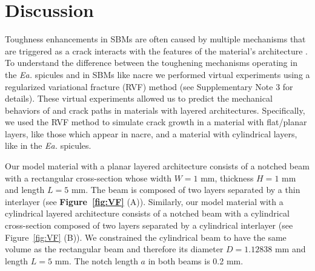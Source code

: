 \documentclass[12pt,onecolumn]{article}
\makeatletter
\DeclareRobustCommand*{\nameref}[1]{%
      \emph{\myorg@nameref{#1}}%
    }%
\newcommand{\EA}{\textit{Ea.\@}\xspace}
\makeatother
\begin{document}
\section*{Discussion}
\label{sec:discussion}
Toughness enhancements in SBMs are often caused by multiple mechanisms that are triggered as a crack interacts with the features of the material's architecture \cite{barthelat2007experimental,currey1977,launey2009fracture}. 
%
%
To understand the difference between the toughening mechanisms operating in the \EA spicules and in SBMs like nacre we performed virtual experiments using a regularized variational fracture (RVF) method (see Supplementary Note 3 for details). These virtual experiments allowed us to predict the  mechanical behaviors of and crack paths in materials with layered architectures. Specifically, we used the RVF method to simulate crack growth in a material with flat/planar layers, like those which appear in nacre, and a material with cylindrical layers, like in the \EA spicules.

Our model material with a planar layered architecture consists of a notched beam with a rectangular cross-section whose width $W=1$ mm, thickness $H=1$ mm and length $L=5$ mm. The beam is composed of two layers separated by a thin interlayer (see {\bf Figure~\ref{fig:VF}} (A)). Similarly, our model material with a cylindrical layered architecture consists of a notched beam with a cylindrical cross-section composed of two layers separated by a cylindrical interlayer (see Figure~\ref{fig:VF} (B)). We constrained the cylindrical beam to have the same volume as the rectangular beam and therefore its diameter $D=1.12838$ mm and length $L=5$ mm. The notch length $a$ in both beams is 0.2 mm.
\end{document}
